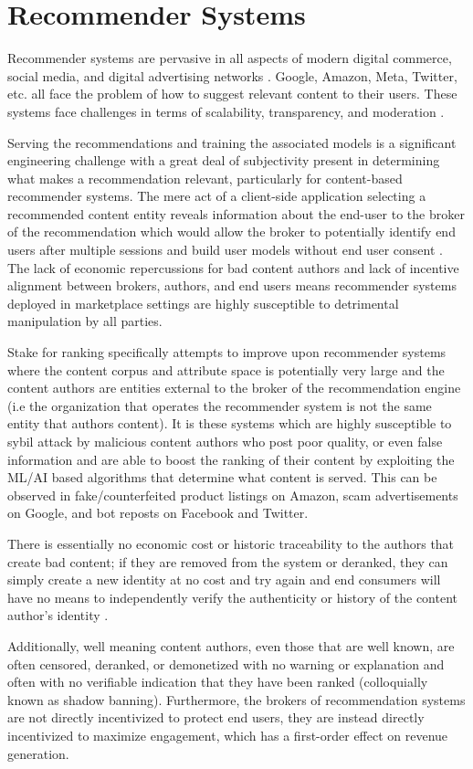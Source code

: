 \section{Recommender Systems}

Recommender systems are pervasive in all aspects of modern digital commerce, social media, and digital advertising networks \cite{resnick1997recommender} \cite{lops2011content} \cite{gomez2015netflix}. Google, Amazon, Meta, Twitter, etc. all face the problem of how to suggest relevant content to their users. These systems face challenges in terms of scalability, transparency, and moderation \cite{wang2022trustworthy}. 

Serving the recommendations and training the associated models is a significant engineering challenge with a great deal of subjectivity present in determining what makes a recommendation relevant, particularly for content-based recommender systems. The mere act of a client-side application selecting a recommended content entity reveals information about the end-user to the broker of the recommendation which would allow the broker to potentially identify end users after multiple sessions and build user models without end user consent \cite{boutet2018collaborative}. The lack of economic repercussions for bad content authors and lack of incentive alignment between brokers, authors, and end users means recommender systems deployed in marketplace settings are highly susceptible to detrimental manipulation by all parties.

Stake for ranking specifically attempts to improve upon recommender systems where the content corpus and attribute space is potentially very large and the content authors are entities external to the broker of the recommendation engine (i.e the organization that operates the recommender system is not the same entity that authors content). It is these systems which are highly susceptible to sybil attack by malicious content authors who post poor quality, or even false information and are able to boost the ranking of their content by exploiting the ML/AI based algorithms that determine what content is served. This can be observed in fake/counterfeited product listings on Amazon, scam advertisements on Google, and bot reposts on Facebook and Twitter. 

There is essentially no economic cost or historic traceability to the authors that create bad content; if they are removed from the system or deranked, they can simply create a new identity at no cost and try again and end consumers will have no means to independently verify the authenticity or history of the content author's identity \cite{lin2022shilling}. 

Additionally, well meaning content authors, even those that are well known, are often censored, deranked, or demonetized with no warning or explanation and often with no verifiable indication that they have been ranked (colloquially known as shadow banning). Furthermore, the brokers of recommendation systems are not directly incentivized to protect end users, they are instead directly incentivized to maximize engagement, which has a first-order effect on revenue generation. 
